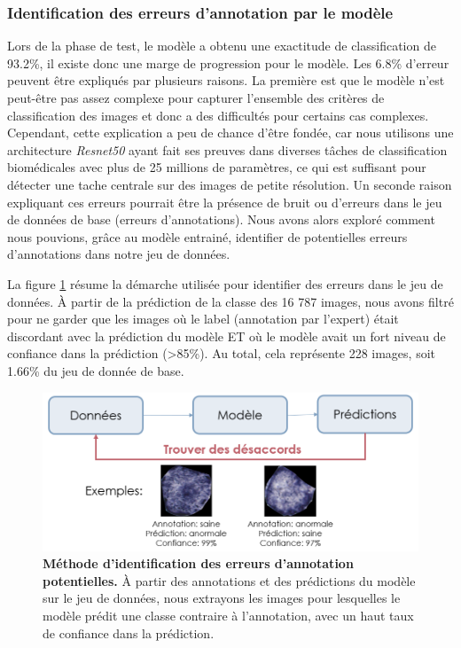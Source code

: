 \subsubsection{Identification des erreurs d'annotation par le modèle}
Lors de la phase de test, le modèle a obtenu une exactitude de classification de 93.2\%, il existe donc une marge de progression pour le modèle. Les 6.8\% d'erreur peuvent être expliqués par plusieurs raisons. La première est que le modèle n'est peut-être pas assez complexe pour capturer l'ensemble des critères de classification des images et donc a des difficultés pour certains cas complexes. Cependant, cette explication a peu de chance d'être fondée, car nous utilisons une architecture \textit{Resnet50} ayant fait ses preuves dans diverses tâches de classification biomédicales avec plus de 25 millions de paramètres, ce qui est suffisant pour détecter une tache centrale sur des images de petite résolution. Un seconde raison expliquant ces erreurs pourrait être la présence de bruit ou d'erreurs dans le jeu de données de base (erreurs d'annotations). Nous avons alors exploré comment nous pouvions, grâce au modèle entrainé, identifier de potentielles erreurs d'annotations dans notre jeu de données.

La figure \ref{fig:identify_errors} résume la démarche utilisée pour identifier des erreurs dans le jeu de données. À partir de la prédiction de la classe des 16 787 images, nous avons filtré pour ne garder que les images où le label (annotation par l'expert) était discordant avec la prédiction du modèle ET où le modèle avait un fort niveau de confiance dans la prédiction (>85\%). Au total, cela représente 228 images, soit 1.66\% du jeu de donnée de base.

\begin{figure}[htbp]
 \centering
 \includegraphics[width=1\textwidth]{figures/identify_errors.png}
 \caption[Méthode d'identification des potentielles erreurs d'annotation]{\textbf{Méthode d'identification des erreurs d'annotation potentielles.} À partir des annotations et des prédictions du modèle sur le jeu de données, nous extrayons les images pour lesquelles le modèle prédit une classe contraire à l'annotation, avec un haut taux de confiance dans la prédiction.}
 \label{fig:identify_errors}
\end{figure}

